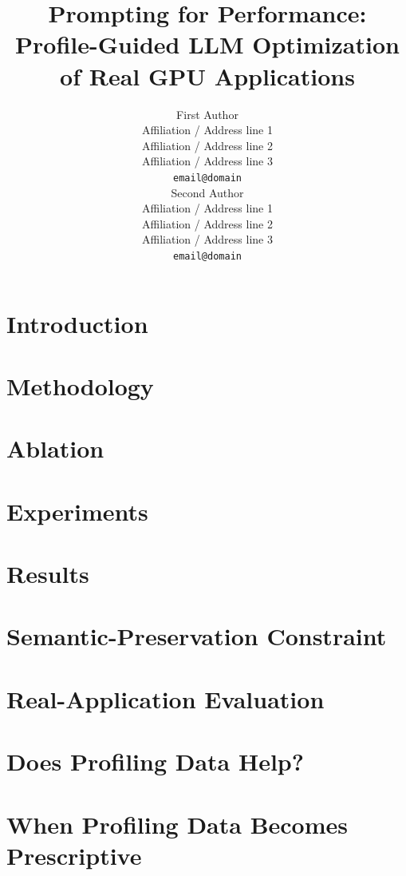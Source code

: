 \documentclass[11pt]{article}
\title{Prompting for Performance: Profile-Guided LLM Optimization\\
       of Real GPU Applications}
\author{First Author \\
  Affiliation / Address line 1 \\
  Affiliation / Address line 2 \\
  Affiliation / Address line 3 \\
  \texttt{email@domain} \\\And
  Second Author \\
  Affiliation / Address line 1 \\
  Affiliation / Address line 2 \\
  Affiliation / Address line 3 \\
  \texttt{email@domain} \\}
\begin{document}
\maketitle
\begin{abstract}

\end{abstract}

\section{Introduction}
\label{sec:intro}


\section{Methodology}
\label{sec:method}


\section{Ablation}
\label{sec:ablation}


\section{Experiments}
\label{sec:explanation}


\section{Results}
\label{sec:results}


\section{Semantic-Preservation Constraint}
\label{sec:intent}


\section{Real-Application Evaluation}
\label{sec:realapps}


\section{Does Profiling Data Help?}
\label{sec:profabl}


\section{When Profiling Data Becomes Prescriptive}
\label{sec:guidvar}

\end{document}
